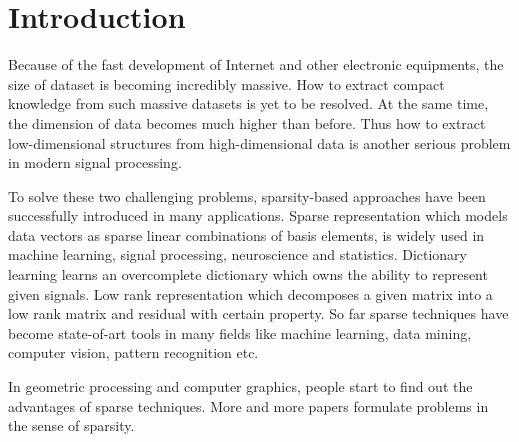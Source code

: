\section{Introduction}
\label{sec:Introduction}
Because of the fast development of Internet and other electronic equipments, the size of dataset is becoming  incredibly massive.
How to extract compact knowledge from such massive datasets is yet to be resolved.
At the same time, the dimension of data becomes much higher than before.
Thus how to extract low-dimensional structures from high-dimensional data is another serious problem in modern signal processing.

To solve these two challenging problems, sparsity-based approaches have been successfully introduced in many applications.
Sparse representation which models data vectors as sparse linear combinations of basis elements, is widely used in machine learning, signal processing, neuroscience and statistics.
Dictionary learning learns an overcomplete dictionary which owns the ability to represent given signals.
Low rank representation which decomposes a given matrix into a low rank matrix and residual with certain property.
So far sparse techniques have become state-of-art tools in many fields like machine learning, data mining, computer vision, pattern recognition etc.

In geometric processing and computer graphics, people start to find out the advantages of sparse techniques.
More and more papers formulate problems in the sense of sparsity. 